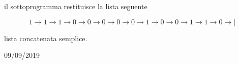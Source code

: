 il sottoprogramma restituisce la lista seguente

$$
1 \rightarrow 1 \rightarrow 1 \rightarrow 0 \rightarrow 0 \rightarrow 0 \rightarrow 0 \rightarrow 0 \rightarrow 1 \rightarrow 0 \rightarrow 0 \rightarrow 1 \rightarrow 1 \rightarrow 0 \rightarrow|
$$ 

\begin{tags}
lista concatenata semplice. 
\end{tags}

\begin{esame}
09/09/2019
\end{esame}




